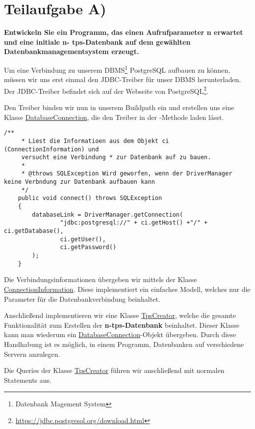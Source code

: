 \section{Teilaufgabe A)}
\textbf{Entwickeln Sie ein Programm, das einen Aufrufparameter n erwartet und eine initiale n-
tps-Datenbank auf dem gewählten Datenbankmanagementsystem erzeugt.}

Um eine Verbindung zu unserem DBMS\footnote{Datenbank Magement
System} PostgreSQL aufbauen zu können, müssen wir uns erst einmal den
JDBC-Treiber für unser DBMS herunterladen. Der JDBC-Treiber befindet sich auf der
Webseite von PostgreSQL\footnote{\url{https://jdbc.postgresql.org/download.html}}.

Den Treiber binden wir nun in unserem Buildpath ein und erstellen
uns eine Klasse \hyperref[lst:dbv2]{DatabaseConnection}, die den Treiber in der
-Methode laden lässt.

\begin{lstlisting}[caption={connect Funktion}]
	/**
	 * Liest die Informatioen aus dem Objekt ci (ConnectionInformation) und
	 versucht eine Verbindung * zur Datenbank auf zu bauen.
	 * 
	 * @throws SQLException Wird geworfen, wenn der DriverManager keine Verbndung zur Datenbank aufbauen kann
	 */
	public void connect() throws SQLException
	{
		databaseLink = DriverManager.getConnection(
				"jdbc:postgresql://" + ci.getHost() +"/" + ci.getDatabase(),
				ci.getUser(), 
				ci.getPassword()
		);
	}
\end{lstlisting}

Die Verbindungsinformationen übergeben wir mittels der Klasse
\hyperref[lst:civ2]{ConnectionInformation}. Diese implementiert ein einfaches
Modell, welches nur die Parameter für die Datenbankverbindung beinhaltet.

Anschließend implementieren wir eine Klasse \hyperref[lst:tpsv2]{TpsCreator},
welche die gesamte Funktionalität zum Erstellen der \textbf{n-tps-Datenbank} beinhaltet.
Dieser Klasse kann man wiederum ein
\hyperref[lst:dbv2]{DatabaseConnection}-Objekt übergeben. Durch diese Handhabung
ist es möglich, in einem Programm, Datenbanken auf verschiedene Servern anzulegen.

Die Queries der Klasse \hyperref[lst:tpsv2]{TpsCreator}
führen wir anschließend mit normalen Statements aus. 

